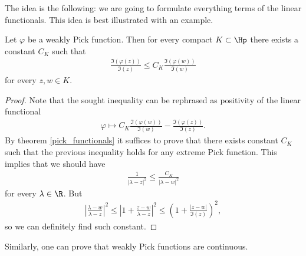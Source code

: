 The idea is the following: we are going to formulate everything terms of the linear functionals. This idea is best illustrated with an example.

\begin{lem}\label{pick_harnack_lemma}
	Let $\varphi$ be a weakly Pick function. Then for every compact $K \subset \Hp$ there exists a constant $C_{K}$ such that
	\begin{align*}
		\frac{\Im(\varphi(z))}{\Im(z)} \leq C_{K} \frac{\Im(\varphi(w))}{\Im(w)}
	\end{align*}
	for every $z, w \in K$.
\end{lem}
\begin{proof}
	Note that the sought inequality can be rephrased as positivity of the linear functional
	\begin{align*}
		\varphi \mapsto C_{K} \frac{\Im(\varphi(w))}{\Im(w)} - \frac{\Im(\varphi(z))}{\Im(z)}.
	\end{align*}
	By theorem \ref{pick_functionals} it suffices to prove that there exists constant $C_{K}$ such that the previous inequality holds for any extreme Pick function. This implies that we should have
	\begin{align*}
		\frac{1}{|\lambda - z|^2} \leq \frac{C_{K}}{|\lambda - w|^2}
	\end{align*}
	for every $\lambda \in \R$. But
	\begin{align*}
		\left|\frac{\lambda - w}{\lambda - z}\right|^2 \leq \left|1 + \frac{z - w}{\lambda - z}\right|^2 \leq \left(1 + \frac{|z - w|}{\Im(z)}\right)^2,
	\end{align*}
	so we can definitely find such constant.
\end{proof}

Similarly, one can prove that weakly Pick functions are continuous.

